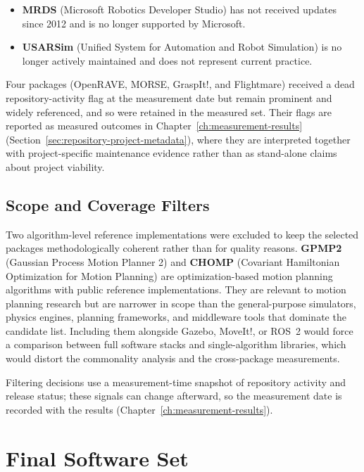 \begin{itemize}
    \item \textbf{MRDS} (Microsoft Robotics Developer Studio) has not received updates since 2012 and is no longer supported by Microsoft.
    \item \textbf{USARSim} (Unified System for Automation and Robot Simulation) is no longer actively maintained and does not represent current practice.
\end{itemize}

Four packages (OpenRAVE, MORSE, GraspIt!, and Flightmare) received a dead repository-activity flag at the measurement date but remain prominent and widely referenced, and so were retained in the measured set. Their flags are reported as measured outcomes in Chapter~\ref{ch:measurement-results} (Section~\ref{sec:repository-project-metadata}), where they are interpreted together with project-specific maintenance evidence rather than as stand-alone claims about project viability.

\subsection{Scope and Coverage Filters}
\label{subsec:scope-coverage-filters}

Two algorithm-level reference implementations were excluded to keep the selected packages methodologically coherent rather than for quality reasons. \textbf{GPMP2} (Gaussian Process Motion Planner 2) and \textbf{CHOMP} (Covariant Hamiltonian Optimization for Motion Planning) are optimization-based motion planning algorithms with public reference implementations. They are relevant to motion planning research but are narrower in scope than the general-purpose simulators, physics engines, planning frameworks, and middleware tools that dominate the candidate list. Including them alongside Gazebo, MoveIt!, or ROS~2 would force a comparison between full software stacks and single-algorithm libraries, which would distort the commonality analysis and the cross-package measurements.

Filtering decisions use a measurement-time snapshot of repository activity and release status; these signals can change afterward, so the measurement date is recorded with the results (Chapter~\ref{ch:measurement-results}).

\section{Final Software Set}
\label{sec:final-software-set}

